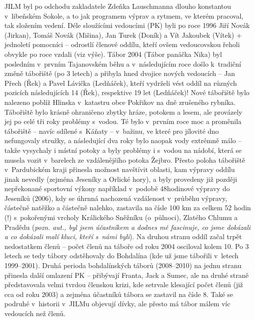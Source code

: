 \documentclass[a5paper, 11pt, twoside]{article}
\begin{document}
JILM byl po odchodu zakladatele Zdeňka Lauschmanna dlouho konstantou
v~libeňském Sokole, a to jak programem výprav a rytmem, ve kterém
pracoval, tak složením vedení. Déle sloužícími vedoucími (PK) byli po
roce 1996 Jiří Novák (Jirkan), Tomáš Novák (Mišina), Jan Turek (Doník) a
Vít Jakoubek (Vítek) + jednoletí pomocníci -- odrostlí členové oddílu,
kteří ovšem vedoucovskou řeholi obvykle po roce vzdali (viz výše). Tábor
2004 (Tábor panáčka Nika) byl posledním v~prvním Tajanovském běhu a
v~následujícím roce došlo k~tradiční změně tábořiště (po 3 letech) a
přibyla hned dvojice nových vedoucích -- Jan Přech (Řek) a Pavel Lávička
(Ledňáček), kteří vydrželi vést oddíl na různých pozicích následujících
14 (Řek), respektive 19 let (Ledňáček)! Nové tábořiště bylo nalezeno
poblíž Hlinska v~katastru obce Pokřikov na dně zrušeného rybníka.
Tábořiště bylo krásně ohraničeno zbytky hráze, potokem a lesem, ale
provázely jej po celé tři roky problémy s~vodou. Té bylo v~prvním roce
moc a proměnila tábořiště -- navíc sdílené s~Káňaty -- v~bažinu, ve
které pro jílovité dno nefungovaly stružky, a následující dva roky bylo
naopak vody extrémně málo -- takže vysychaly i místní potoky a byly
problémy i s~vodou na nádobí, která se musela vozit v~barelech ze
vzdálenějšího potoka Žejbro. Přesto poloha tábořiště v~Pardubickém kraji
přinesla možnost navštívit oblasti, kam výpravy oddílu jinak nevedly
(zejména Jeseníky a Orlické hory), a byly provedeny již později
nepřekonané sportovní výkony například v~podobě 48hodinové výpravy do
Jeseníků (2006), kdy se úhrnná nachozená vzdálenost v~průběhu výpravy,
částečně natěžko a částečně nalehko, zastavila na čísle 100 km za celkem
52 hodin (!) s~pokořenými vrcholy Králického Sněžníku (o~půlnoci),
Zlatého Chlumu a Pradědu (\textit{pozn. aut., byl jsem účastníkem a dodnes
mě fascinuje, co jsme dokázali a co dokázali malí kluci, kteří s~námi
byli}). Na druhou stranu oddíl začal trpět nedostatkem členů -- počet
členů na táboře od roku 2004 osciloval kolem 10. Po 3 letech se tedy
tábory odstěhovaly do Bohdalína (kde už jsme tábořili v~letech
1999--2001). Druhá perioda bohdalínských táborů (2008--2010) na jednu
stranu přinesla další omlazení PK -- přibývají Franta, Jack a Sumec, ale
na druhé straně představovala velmi tvrdou členskou krizi, kde setrvale
klesající počet členů (již cca od roku 2003) a zejména účastníků tábora
se zastavil na čísle 8. Také se podruhé v~historii v~JILMu objevují
dívky, ale přesto má tábor málem víc vedoucích než členů.
\end{document}

